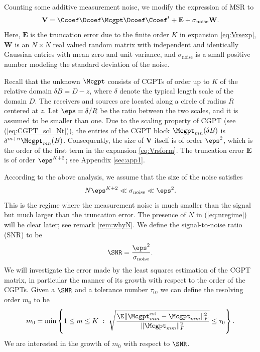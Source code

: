 Counting some additive measurement noise, we modify the expression
of MSR to
\begin{equation}
\mathbf{V} = \Ccoef \Dcoef \Mcgpt \Dcoef \Ccoef^t + \mathbf{E} +
\sigma_{\mathrm{noise}} \mathbf{W}. \label{eq:Vmodel}
\end{equation}
Here, $\mathbf{E}$ is the truncation error due to the finite order
$K$ in expansion \eqref{eq:Vrsexp}, $\mathbf{W}$ is an $N \times
N$ real valued random matrix with independent and identically
Gaussian entries with mean zero and unit variance, and
$\sigma_{\mathrm{noise}}$ is a small positive number modeling the
standard deviation of the noise.

Recall that the unknown $\Mcgpt$ consists of CGPTs of order up to
$K$ of the relative domain $\delta B = D - z$, where $\delta$
denote the typical length scale of the domain $D$. The receivers
and sources are located along a circle of radius $R$ centered at
$z$. Let $\eps = \delta/R$ be the ratio between the two scales,
and it is assumed to be smaller than one. Due to the scaling
property of CGPT (see (\ref{eq:CGPT_scl_Nt})), the entries of the
CGPT block $\Mcgpt_{mn}(\delta B)$ is
$\delta^{m+n}\Mcgpt_{mn}(B)$. Consequently, the size of
$\mathbf{V}$ itself is of order $\eps^2$, which is the order of
the first term in the expansion \eqref{eq:Vrsform}. The truncation
error $\mathbf{E}$ is of order $\eps^{K+2}$; see Appendix
\ref{sec:app1}.

According to the above analysis, we assume that the size of the
noise satisfies
\begin{equation}
N \eps^{K+2} \ll \sigma_{\mathrm{noise}} \ll \eps^2.
\label{eq:nregime}
\end{equation}
This is the regime where the measurement noise is much smaller
than the signal but much larger than the truncation error. The
presence of $N$ in (\ref{eq:nregime}) will be clear later; see
remark \ref{rem:whyN}. We define the signal-to-noise ratio (SNR)
to be
$$
\SNR = \frac{\eps^2}{\sigma_{\mathrm{noise}}}.
$$
We will investigate the error made by the least squares estimation
of the CGPT matrix, in particular the manner of its growth with
respect to the order of the CGPTs. Given a $\SNR$ and a tolerance
number $\tau_0$, we can define the resolving order $m_0$ to be
\begin{equation}
m_0 = \min \left\{ 1 \le m \le K ~:~ \sqrt{\frac{\E
\|\Mcgpt^{\mathrm{est}}_{mm} -
\Mcgpt_{mm}\|^2_F}{\|\Mcgpt_{mm}\|^2_F}} \le \tau_0 \right\}.
\label{eq:msdef}
\end{equation}
We are interested in the growth of $m_0$ with respect to $\SNR$.

